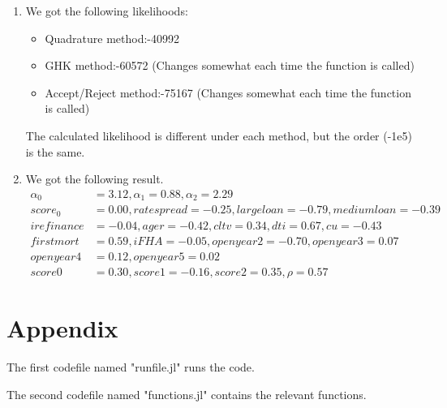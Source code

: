 \documentclass[landscape]{article} %
\theoremstyle{definition}
\begin{document}
\begin{enumerate}
\item We got the following likelihoods: 
  \begin{itemize}
  \item  Quadrature method:-40992
  \item  GHK method:-60572 (Changes somewhat each time the function is called)
  \item  Accept/Reject method:-75167 (Changes somewhat each time the function is called)
  \end{itemize}
  The calculated likelihood is different under each method, but the order (-1e5) is the same.  
\item We got the following result. 
  \begin{align*}
    \alpha_0 &= 3.12, \alpha_1 = 0.88, \alpha_2 = 2.29 \\
    score_0 &= 0.00, rate spread = -0.25, large loan = -0.79, medium loan = -0.39 \\ 
    i refinance &= -0.04, age r = -0.42, cltv = 0.34, dti = 0.67, cu = -0.43 \\
    first mort &= 0.59, i FHA = -0.05, open year 2 = -0.70,open year 3 = 0.07 \\ 
    open year 4 &= 0.12, open year 5 =0.02 \\
    score0  &= 0.30, score1 = -0.16, score2 = 0.35, \rho = 0.57 
  \end{align*}
\end{enumerate}

\newpage
\section*{Appendix}
 	The first codefile named "runfile.jl" runs the code.
	
 	The second codefile named "functions.jl" contains the relevant functions.
\end{document}
